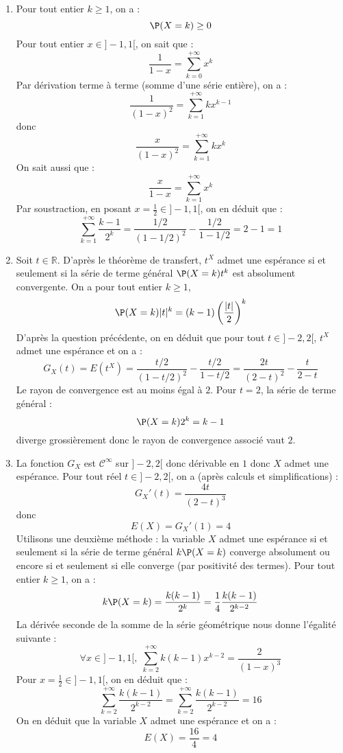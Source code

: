 \documentclass[a4paper,10pt]{report}
\begin{document}
\begin{enumerate}
\item Pour tout entier $k \geq 1$, on a :
$$ \P(X=k) \geq 0$$
Pour tout entier $x \in ]-1,1[$, on sait que :
$$ \dfrac{1}{1-x} = \sum_{k=0}^{+ \infty} x^k $$
Par dérivation terme à terme (somme d'une série entière), on a :
$$ \dfrac{1}{(1-x)^2} = \sum_{k=1}^{+ \infty} k x^{k-1}$$
donc
$$ \dfrac{x}{(1-x)^2} = \sum_{k=1}^{+ \infty} k x^{k}$$
On sait aussi que :
$$ \dfrac{x}{1-x} = \sum_{k=1}^{+ \infty}  x^{k}$$
Par soustraction, en posant $x = \tfrac{1}{2} \in ]-1,1[$, on en déduit que :
$$ \sum_{k=1}^{+ \infty} \dfrac{k-1}{2^k} = \dfrac{1/2}{(1-1/2)^2} - \dfrac{1/2}{1-1/2} = 2-1=1$$
\item Soit $t \in \mathbb{R}$. D'après le théorème de transfert, $t^X$ admet une espérance si et seulement si la série de terme général $\P(X=k) t^k$ est absolument convergente. On a pour tout entier $k \geq 1$,
$$ \P(X=k) \vert t \vert ^k = (k-1) \left( \dfrac{\vert t \vert }{2} \right)^k$$
D'après la question précédente, on en déduit que pour tout $t \in ]-2,2[$, $t^X$ admet une espérance et on a :
$$ G_X(t) =E(t^X) = \dfrac{t/2}{(1-t/2)^2} - \dfrac{t/2}{1-t/2} =  \dfrac{2t}{(2-t)^2} - \dfrac{t}{2-t}  $$
Le rayon de convergence est au moins égal à $2$. Pour $t=2$, la série de terme général :
$$ \P(X=k) 2^k = k-1$$
diverge grossièrement donc le rayon de convergence associé vaut $2$.
\item La fonction $G_X$ est $\mathcal{C}^{\infty}$ sur $]-2,2[$ donc dérivable en $1$ donc $X$ admet une espérance. Pour tout réel $t \in ]-2,2[$, on a (après calculs et simplifications) :
$$ G_X'(t) = \dfrac{4t}{(2-t)^3}$$
donc
$$ E(X) = G_X'(1) = 4$$
Utilisons une deuxième méthode : la variable $X$ admet une espérance si et seulement si la série de terme général $k \P(X=k)$ converge absolument ou encore si et seulement si elle converge (par positivité des termes). Pour tout entier $k \geq 1$, on a :
$$ k \P(X=k) =\dfrac{k(k-1)}{2^k} = \dfrac{1}{4} \dfrac{k(k-1)}{2^{k-2}}$$
La dérivée seconde de la somme de la série géométrique nous donne l'égalité suivante :
$$ \forall x \in ]-1,1[, \; \sum_{k=2}^{+ \infty} k(k-1) x^{k-2} = \dfrac{2}{(1-x)^3}$$
Pour $x= \tfrac{1}{2} \in ]-1,1[$, on en déduit que :
$$  \sum_{k=2}^{+ \infty}  \dfrac{k(k-1)}{2^{k-2}} =  \sum_{k=2}^{+ \infty}  \dfrac{k(k-1)}{2^{k-2}} = 16$$
On en déduit que la variable $X$ admet une espérance et on a :
$$ E(X) = \dfrac{16}{4} = 4$$
\end{enumerate}
\end{document}
